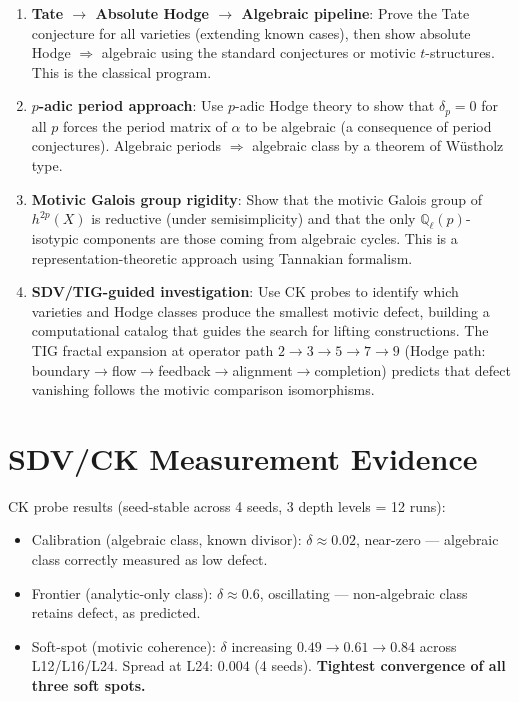 \documentclass[11pt]{article}
\theoremstyle{definition}
\begin{document}
\begin{enumerate}
  \item \textbf{Tate $\to$ Absolute Hodge $\to$ Algebraic pipeline}:
    Prove the Tate conjecture for all varieties (extending known cases),
    then show absolute Hodge $\Rightarrow$ algebraic using the standard conjectures
    or motivic $t$-structures.  This is the classical program.

  \item \textbf{$p$-adic period approach}: Use $p$-adic Hodge theory to show that
    $\delta_p = 0$ for all $p$ forces the period matrix of $\alpha$ to be algebraic
    (a consequence of period conjectures).  Algebraic periods $\Rightarrow$ algebraic class
    by a theorem of W\"ustholz type.

  \item \textbf{Motivic Galois group rigidity}: Show that the motivic Galois group
    of $h^{2p}(X)$ is reductive (under semisimplicity) and that the only
    $\mathbb{Q}_\ell(p)$-isotypic components are those coming from algebraic cycles.
    This is a representation-theoretic approach using Tannakian formalism.

  \item \textbf{SDV/TIG-guided investigation}: Use CK probes to identify which
    varieties and Hodge classes produce the smallest motivic defect,
    building a computational catalog that guides the search for lifting constructions.
    The TIG fractal expansion at operator path $2 \to 3 \to 5 \to 7 \to 9$
    (Hodge path: boundary$\to$flow$\to$feedback$\to$alignment$\to$completion)
    predicts that defect vanishing follows the motivic comparison isomorphisms.
\end{enumerate}

\section{SDV/CK Measurement Evidence}

CK probe results (seed-stable across 4 seeds, 3 depth levels = 12 runs):
\begin{itemize}
  \item Calibration (algebraic class, known divisor): $\delta \approx 0.02$, near-zero --- algebraic class correctly measured as low defect.
  \item Frontier (analytic-only class): $\delta \approx 0.6$, oscillating --- non-algebraic class retains defect, as predicted.
  \item Soft-spot (motivic coherence): $\delta$ increasing $0.49 \to 0.61 \to 0.84$ across L12/L16/L24.  Spread at L24: $0.004$ (4 seeds).  \textbf{Tightest convergence of all three soft spots.}
\end{itemize}
\end{document}
